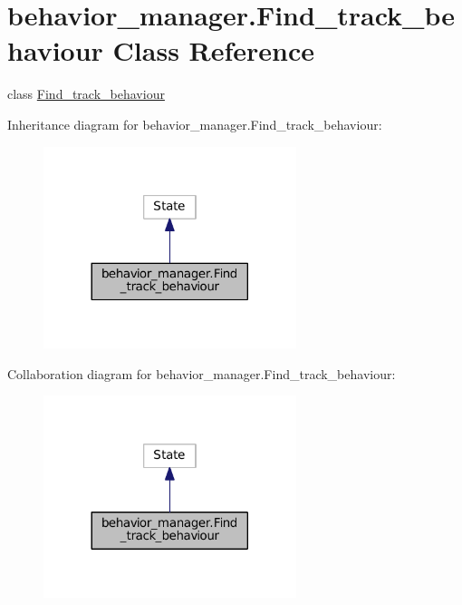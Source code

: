 \hypertarget{classbehavior__manager_1_1Find__track__behaviour}{}\section{behavior\+\_\+manager.\+Find\+\_\+track\+\_\+behaviour Class Reference}
\label{classbehavior__manager_1_1Find__track__behaviour}


class \hyperlink{classbehavior__manager_1_1Find__track__behaviour}{Find\+\_\+track\+\_\+behaviour}  




Inheritance diagram for behavior\+\_\+manager.\+Find\+\_\+track\+\_\+behaviour\+:
\nopagebreak
\begin{figure}[H]
\begin{center}
\leavevmode
\includegraphics[width=209pt]{classbehavior__manager_1_1Find__track__behaviour__inherit__graph}
\end{center}
\end{figure}


Collaboration diagram for behavior\+\_\+manager.\+Find\+\_\+track\+\_\+behaviour\+:
\nopagebreak
\begin{figure}[H]
\begin{center}
\leavevmode
\includegraphics[width=209pt]{classbehavior__manager_1_1Find__track__behaviour__coll__graph}
\end{center}
\end{figure}
